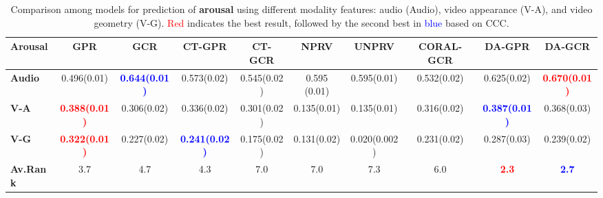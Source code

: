 \documentclass{article}
\begin{document}
    
    \begin{table*}[tbh]
	\begin{center}
    \caption{Comparison among models for prediction of \textbf{arousal} using different modality features:  audio (Audio), video appearance (V-A), and video geometry (V-G).  \textcolor{red}{Red} indicates the best result, followed by the second best in \textcolor{blue}{blue} based on CCC.}
			\label{tb:avec_arousal}
			{\footnotesize
				\hfill{}
				\begin{tabular}{lccccccccc} 
					\toprule
					\textbf{Arousal} & GPR & GCR & CT-GPR & CT-GCR  & NPRV & UNPRV & CORAL-GCR  & DA-GPR  & DA-GCR \\
					\midrule
					\textbf{Audio} & 0.496(0.01) & \textcolor{blue}{ \textbf{0.644(0.01)}} & 0.573(0.02) &0.545(0.02) & 0.595 (0.01) & 0.595(0.01)   & 0.532(0.02)& 0.625(0.02) & \textcolor{red}{\textbf{0.670(0.01)}}   \\ 
					
					\textbf{V-A} &\textcolor{red}{\textbf{0.388(0.01)}} & 0.306(0.02) & 0.336(0.02) & 0.301(0.02) & 0.135(0.01) & 0.135(0.01) & 0.316(0.02) & \textcolor{blue}{\textbf{0.387(0.01)}} & 0.368(0.03) \\  
                    
					\textbf{V-G} &  \textcolor{red}{ \textbf{0.322(0.01)}} & 0.227(0.02) & \textcolor{blue}{\textbf{0.241(0.02)}} & 0.175(0.02) & 0.131(0.02) & 0.020(0.002)  & 0.231(0.02) & 0.287(0.03) & 0.239(0.02)  \\  
                    \midrule
                    
                    \textbf{Av.Rank} & 3.7 & 4.7  & 4.3  & 7.0 & 7.0  & 7.3 & 6.0 & \textcolor{red}{\textbf{2.3}}  & \textcolor{blue}{\textbf{2.7}}     \\                                  \bottomrule
			\end{tabular}}
			\hfill{}
	\end{center}
\end{table*}
\end{document}
